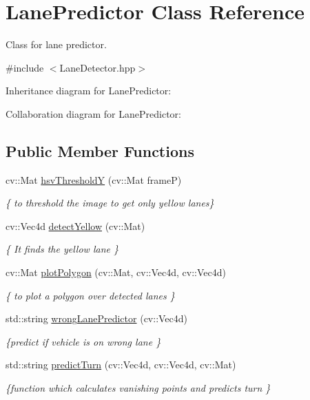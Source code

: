 \hypertarget{classLanePredictor}{}\section{Lane\+Predictor Class Reference}
\label{classLanePredictor}


Class for lane predictor.  




{\ttfamily \#include $<$Lane\+Detector.\+hpp$>$}



Inheritance diagram for Lane\+Predictor\+:


Collaboration diagram for Lane\+Predictor\+:
\subsection*{Public Member Functions}
\begin{DoxyCompactItemize}
\item 
cv\+::\+Mat \hyperlink{classLanePredictor_ada11760da395c1d2f9e6117212659742}{hsv\+ThresholdY} (cv\+::\+Mat frameP)
\begin{DoxyCompactList}\small\item\em \{ to threshold the image to get only yellow lanes\} \end{DoxyCompactList}\item 
cv\+::\+Vec4d \hyperlink{classLanePredictor_a2ab03a2ebd0cca2c27a5773533f16dd3}{detect\+Yellow} (cv\+::\+Mat)
\begin{DoxyCompactList}\small\item\em \{ It finds the yellow lane \} \end{DoxyCompactList}\item 
cv\+::\+Mat \hyperlink{classLanePredictor_ab793993ceb4f18d3fcd2b57779fef859}{plot\+Polygon} (cv\+::\+Mat, cv\+::\+Vec4d, cv\+::\+Vec4d)
\begin{DoxyCompactList}\small\item\em \{ to plot a polygon over detected lanes \} \end{DoxyCompactList}\item 
std\+::string \hyperlink{classLanePredictor_ac930fa52cdede9afa25bbf7cafd8c6b5}{wrong\+Lane\+Predictor} (cv\+::\+Vec4d)
\begin{DoxyCompactList}\small\item\em \{predict if vehicle is on wrong lane \} \end{DoxyCompactList}\item 
std\+::string \hyperlink{classLanePredictor_a9b72c2dfa77992f7f8e229c3a67103f7}{predict\+Turn} (cv\+::\+Vec4d, cv\+::\+Vec4d, cv\+::\+Mat)
\begin{DoxyCompactList}\small\item\em \{function which calculates vanishing points and predicts turn \} \end{DoxyCompactList}\end{DoxyCompactItemize}


